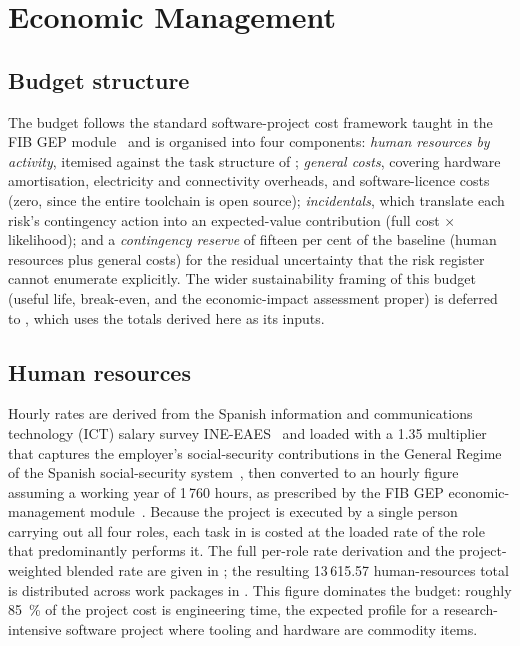 \section{Economic Management}
\label{sec:mgmt-budget}

\subsection{Budget structure}

The budget follows the standard software-project cost framework
taught in the FIB GEP module~\cite{gepModule24EconomicManagement}
and is organised into four components: \textit{human resources by
activity}, itemised against the task structure of
; \textit{general costs}, covering
hardware amortisation, electricity and connectivity overheads, and
software-licence costs (zero, since the entire toolchain is open
source); \textit{incidentals}, which translate each risk's
contingency action into an expected-value contribution (full cost
$\times$ likelihood); and a \textit{contingency reserve} of fifteen
per cent of the baseline (human resources plus general costs) for
the residual uncertainty that the risk register cannot enumerate
explicitly.
The wider sustainability framing of this budget (useful life,
break-even, and the economic-impact assessment proper) is
deferred to , which uses the
totals derived here as its inputs.

\subsection{Human resources}

Hourly rates are derived from the Spanish information and communications
technology (ICT) salary survey
INE-EAES~\cite{ineEncuestaEstructuraSalarial2023} and loaded with
a \num{1.35} multiplier that captures the employer's
social-security contributions in the General Regime of the
Spanish social-security
system~\cite{segSocialCotizacion2025}, then converted to an hourly
figure assuming a working year of 1\,760 hours, as prescribed by the
FIB GEP economic-management
module~\cite{gepModule24EconomicManagement}.
Because the project is executed by a single person carrying out all
four roles, each task in  is costed at the
loaded rate of the role that predominantly performs it.
The full per-role rate derivation and the project-weighted blended
rate are given in ; the resulting
\EUR{}13\,615.57 human-resources total is distributed across work
packages in .
This figure dominates the budget: roughly \SI{85}{\percent} of
the project cost is engineering time, the expected profile for a
research-intensive software project where tooling and hardware are
commodity items.

